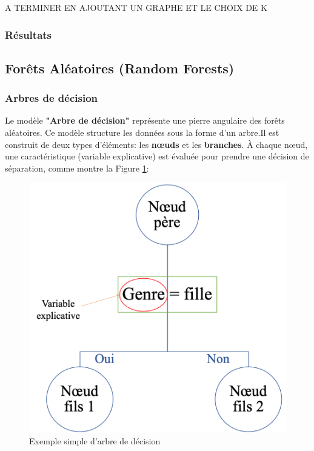 \documentclass[11pt]{article}
\begin{document}

A TERMINER EN AJOUTANT UN GRAPHE ET LE CHOIX DE K

\subsubsection{Résultats}

\subsection{Forêts Aléatoires (Random Forests)}

\subsubsection{Arbres de décision}

Le modèle \textbf{"Arbre de décision"} représente une pierre angulaire des forêts aléatoires. Ce modèle structure les données sous la forme d'un arbre.Il est construit de deux types d'éléments: les \textbf{nœuds} et les \textbf{branches}. À chaque nœud, une caractéristique (variable explicative) est évaluée pour prendre une décision de séparation, comme montre la Figure \ref{tree}:

\begin{figure}[hbt!]
    \centering
    \includegraphics[width = 7 cm]{./figures/tree.png}
    \caption{Exemple simple d'arbre de décision}
    \label{tree}
\end{figure}
\FloatBarrier
\end{document}
